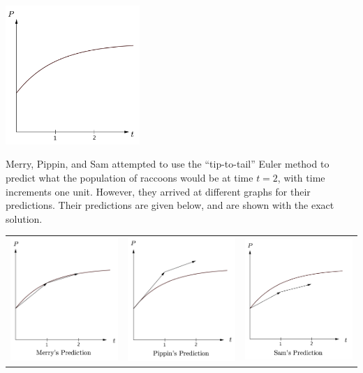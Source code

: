 \begin{enumerate}
\begin{center}
\includegraphics[width=2in]{03/03HWLotRExact.png}
\end{center}

Merry, Pippin, and Sam attempted to use the ``tip-to-tail'' Euler method to predict what the population of raccoons would be at time $t = 2$, with time increments one unit.  However, they arrived at different graphs for their predictions.  Their predictions are given below, and are shown with the exact solution.

\begin{tabular}{ccc}
\includegraphics[width=2in]{03/03HWLotRMerry.png} & \includegraphics[width=2in]{03/03HWLotRPippin.png} & \includegraphics[width=2in]{03/03HWLotRSam.png}\\
\end{tabular}


\end{enumerate}

